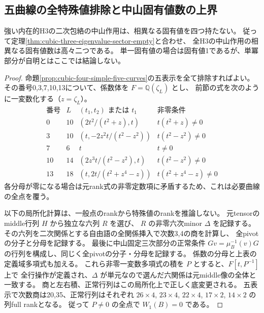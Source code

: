 \subsection{五曲線の全特殊値排除と中山固有値数の上界}
\label{subsec:cubic-four-simple-final-curves}
\begin{theorem}\label{thm:cubic-four-simple-sector-empty}
強い内在的H3の二次包絡の中山作用は、相異なる固有値を四つ持たない。
従って定理\ref{thm:cubic-three-eigenvalue-sector-empty}と合わせ、
全H3の中山作用の相異なる固有値数は高々二つである。
単一固有値の場合は固有値1であるが、単冪部分が自明とはここでは結論しない。
\end{theorem}
\begin{proof}
命題\ref{prop:cubic-four-simple-five-curves}の五表示を全て排除すればよい。
その番号0,3,7,10,13について、係数体を $F=\mathbb Q(\zeta_L)$ とし、
前節の式を次のように一変数化する（$z=\zeta_L$）。
\[
\begin{array}{c|r|c|c}
\text{番号}&L&(t_1,t_2)\text{ または }t_1&\text{非零条件}\\\hline
0&10&(2t^2/(t^2+z),t)&t(t^2+z)\ne0\\
3&10&(t,-2z^2t/(t^2-z^2))&t(t^2-z^2)\ne0\\
7&6&t&t\ne0\\
10&14&(2z^3t/(t^2-z^2),t)&t(t^2-z^2)\ne0\\
13&18&(t,2t/(t^2+z^4-z))&t(t^2+z^4-z)\ne0
\end{array}
\]
各分母が零になる場合は元rank式の非零定数項に矛盾するため、これは必要曲線の全点を覆う。

以下の局所化計算は、一般点のrankから特殊値のrankを推論しない。
元tensorのmiddle行列 $H$ から独立な六列 $R$ を選び、
$R$ の非零六次minor $\Delta$ を記録する。
その六列を二次関係とする自由語の全関係挿入で次数3,4の商を計算し、
全pivotの分子と分母を記録する。
最後に中山固定三次部分の正常条件
$Gv=\mu_B^{-1}(v)G$ の行列を構成し、同じく全pivotの分子・分母を記録する。
係数の分母と上表の定義域多項式も加える。
これら非零一変数多項式の積を $P$ とすると、$F[t,P^{-1}]$ 上で
全行操作が定義され、$\Delta$ が単元なので選んだ六関係は元middle像の全体と一致する。
商と左右積、正常行列はこの局所化上で正しく底変更される。
五表示で次数商は20,35、正常行列はそれぞれ
$26\times4$, $23\times4$, $22\times4$, $17\times2$, $14\times2$ の列full rankとなる。
従って $P\ne0$ の全点で $W_1(B)=0$ である。


\end{proof}
